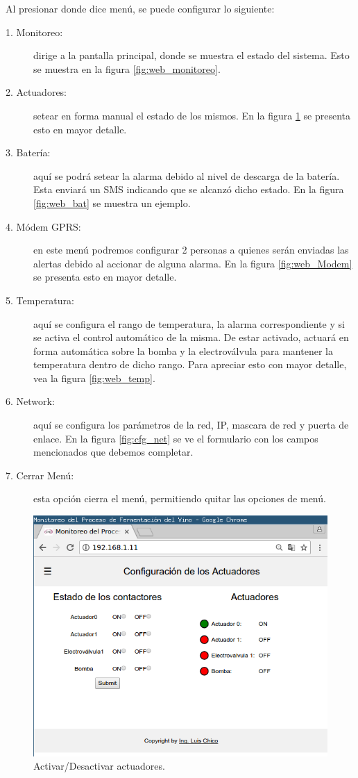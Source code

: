 Al presionar donde dice menú, se puede configurar lo siguiente:
\begin{description}
  \item[1. Monitoreo:] dirige a la pantalla principal, donde se muestra el estado del sistema. Esto se muestra en la figura \ref{fig:web_monitoreo}.
  \item[2. Actuadores:] setear en forma manual el estado de los mismos. En la figura \ref{fig:web_act} se presenta esto en mayor detalle.
  \item[3. Batería:] aquí se podrá setear la alarma debido al nivel de descarga de la batería. Esta enviará un SMS indicando que se alcanzó dicho estado. En la figura \ref{fig:web_bat} se muestra un ejemplo.
  \item[4. Módem GPRS:] en este menú podremos configurar 2 personas a quienes serán enviadas las alertas debido al accionar de alguna alarma. En la figura \ref{fig:web_Modem} se presenta esto en mayor detalle.
  \item[5. Temperatura:] aquí se configura el rango de temperatura, la alarma correspondiente y si se activa el control automático de la misma. De estar activado, actuará en forma automática sobre la bomba y la electroválvula para mantener la temperatura dentro de dicho rango. Para apreciar esto con mayor detalle, vea la figura \ref{fig:web_temp}.
  \item[6. Network:] aquí se configura los parámetros de la red, IP, mascara de red y puerta de enlace. En la figura \ref{fig:cfg_net} se ve el formulario con los campos mencionados que debemos completar.
  \item[7. Cerrar Menú:] esta opción cierra el menú, permitiendo quitar las opciones de menú.
\end{description}

\begin{figure}[h]
  \centering
  \includegraphics[width=1\linewidth]{./Figures/config_act.png}
  \caption{ Activar/Desactivar actuadores.}
  \label{fig:web_act}
\end{figure}

